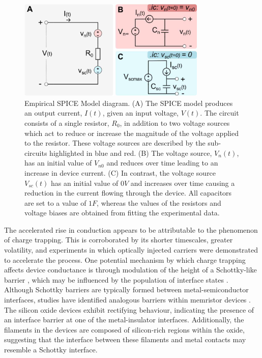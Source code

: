 \begin{figure}[htbp!] 
    \centering    
    \includegraphics[width=0.8\textwidth]{Chapter5/Figs/d.png}
    \caption[Empirical SPICE Model diagram.]{Empirical SPICE Model diagram. (A) The SPICE model produces an output current, $I(t)$, given an input voltage, $V(t)$. The circuit consists of a single resistor, $R_0$, in addition to two voltage sources which act to reduce or increase the magnitude of the voltage applied to the resistor. These voltage sources are described by the sub-circuits highlighted in blue and red. (B) The voltage source, $V_n(t)$, has an initial value of $V_{n0}$ and reduces over time leading to an increase in device current. (C) In contrast, the voltage source $V_{sc}(t)$ has an initial value of $0V$ and increases over time causing a reduction in the current flowing through the device. All capacitors are set to a value of $1F$, whereas the values of the resistors and voltage biases are obtained from fitting the experimental data.}
    \label{fig:5d}
\end{figure}


\noindent The accelerated rise in conduction appears to be attributable to the phenomenon of charge trapping. This is corroborated by its shorter timescales, greater volatility, and experiments in which optically injected carriers were demonstrated to accelerate the process. One potential mechanism by which charge trapping affects device conductance is through modulation of the height of a Schottky-like barrier \cite{cowley1965surface}, which may be influenced by the population of interface states \cite{sze2021physics}. \\

\noindent Although Schottky barriers are typically formed between metal-semiconductor interfaces, studies have identified analogous barriers within memristor devices \cite{hansen2015double}. The silicon oxide devices exhibit rectifying behaviour, indicating the presence of an interface barrier at one of the metal-insulator interfaces. Additionally, the filaments in the devices are composed of silicon-rich regions within the oxide, suggesting that the interface between these filaments and metal contacts may resemble a Schottky interface.\\

